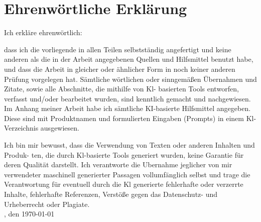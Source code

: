 

\chapter{Ehrenwörtliche Erklärung}
Ich erkläre ehrenwörtlich:

dass ich die vorliegende \art\xspace in allen Teilen selbstständig angefertigt und keine anderen als die in der Arbeit angegebenen Quellen und Hilfsmittel benutzt habe, und dass die Arbeit in gleicher oder ähnlicher Form in noch keiner anderen Prüfung vorgelegen hat. Sämtliche wörtlichen oder sinngemäßen Übernahmen und Zitate, sowie alle Abschnitte, die mithilfe von Kl- basierten Tools entworfen, verfasst und/oder bearbeitet wurden, sind kenntlich gemacht und nachgewiesen. Im Anhang meiner Arbeit habe ich sämtliche KI-basierte Hilfsmittel angegeben. Diese sind mit Produktnamen und formulierten Eingaben (Prompts) in einem Kl-Verzeichnis ausgewiesen.

Ich bin mir bewusst, dass die Verwendung von Texten oder anderen Inhalten und Produk- ten, die durch Kl-basierte Tools generiert wurden, keine Garantie für deren Qualität darstellt. Ich verantworte die Ubernahme jeglicher von mir verwendeter maschinell generierter Passagen vollumfänglich selbst und trage die Verantwortung für eventuell durch die Kl generierte fehlerhafte oder verzerrte Inhalte, fehlerhafte Referenzen, Verstöße gegen das Datenschutz- und Urheberrecht oder Plagiate.\\

\ort, den \today



\autor\\

